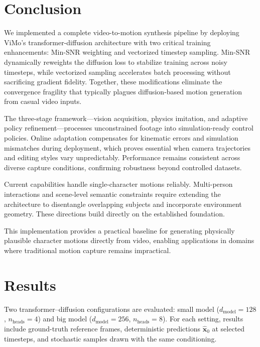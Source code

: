 \section{Conclusion}
\label{sec:conclusion}
We implemented a complete video-to-motion synthesis pipeline by deploying ViMo's transformer-diffusion architecture with two critical training enhancements: Min-SNR weighting and vectorized timestep sampling. Min-SNR dynamically reweights the diffusion loss to stabilize training across noisy timesteps, while vectorized sampling accelerates batch processing without sacrificing gradient fidelity. Together, these modifications eliminate the convergence fragility that typically plagues diffusion-based motion generation from casual video inputs.

The three-stage framework—vision acquisition, physics imitation, and adaptive policy refinement—processes unconstrained footage into simulation-ready control policies. Online adaptation compensates for kinematic errors and simulation mismatches during deployment, which proves essential when camera trajectories and editing styles vary unpredictably. Performance remains consistent across diverse capture conditions, confirming robustness beyond controlled datasets.

Current capabilities handle single-character motions reliably. Multi-person interactions and scene-level semantic constraints require extending the architecture to disentangle overlapping subjects and incorporate environment geometry. These directions build directly on the established foundation.

This implementation provides a practical baseline for generating physically plausible character motions directly from video, enabling applications in domains where traditional motion capture remains impractical.

\newpage
\section{Results}
\label{sec:results}

Two transformer–diffusion configurations are evaluated:
small model (\(d_{\text{model}} = 128\), \(n_{\text{heads}} = 4\)) and
big model (\(d_{\text{model}} = 256\), \(n_{\text{heads}} = 8\)).
For each setting, results include ground-truth reference frames,
deterministic predictions \(\hat{\mathbf{x}}_0\) at selected timesteps,
and stochastic samples drawn with the same conditioning.


